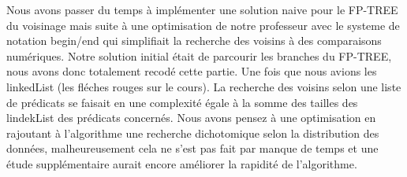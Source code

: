 Nous avons passer du temps à implémenter une solution naive pour le FP-TREE du voisinage mais suite à une optimisation de notre professeur avec le systeme de notation begin/end qui simplifiait la recherche des voisins à des comparaisons numériques. Notre solution initial était de parcourir les branches du FP-TREE, nous avons donc totalement recodé cette partie. Une fois que nous avions les linkedList (les fléches rouges sur le cours). La recherche des voisins selon une liste de prédicats se faisait en une complexité égale à la somme des tailles des lindekList des prédicats concernés. Nous avons pensez à une optimisation en rajoutant à l'algorithme une recherche dichotomique selon la distribution des données, malheureusement cela ne s'est pas fait par manque de temps et une étude supplémentaire aurait encore améliorer la rapidité de l'algorithme.
